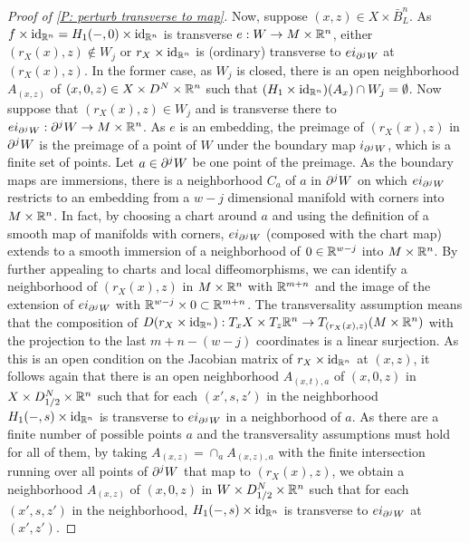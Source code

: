 \begin{proof}[Proof of \cref{P: perturb transverse to map}]
Now, suppose $(x,z)\in X\times \bar B^n_L$. As $f\times \mathrm{id}_{\mathbb{R}^n}=H_1(-,0)\times \mathrm{id}_{\mathbb{R}^n}$ is transverse $e:W\to M\times \mathbb{R}^n$, either $(r_X(x),z)\notin W_j$ or $r_X\times \mathrm{id}_{\mathbb{R}^n}$ is (ordinary) transverse to $ei_{\partial^jW}$ at $(r_X(x),z)$. In the former case, as $W_j$ is closed, there is an open neighborhood $A_{(x,z)}$ of $(x,0,z)\in X\times D^N\times \mathbb{R}^n$ such that $(H_1\times \mathrm{id}_{\mathbb{R}^n})(A_x)\cap W_j=\emptyset$. Now suppose that $(r_X(x),z)\in W_j$ and is transverse there to $ei_{\partial^jW}:\partial^jW\to M\times \mathbb{R}^n$. As $e$ is an embedding, the preimage of $(r_X(x),z)$ in $\partial^jW$ is the preimage of a point of $W$ under the boundary map $i_{\partial^jW}$, which is a finite set of points. Let $a\in \partial^jW$ be one point of the preimage. As the boundary maps are immersions, there is a neighborhood $C_a$ of $a$ in $\partial^jW$ on which $ei_{\partial^jW}$ restricts to an embedding from a $w-j$ dimensional manifold with corners into $M\times \mathbb{R}^n$. In fact, by choosing a chart around $a$ and using the definition of a smooth map of manifolds with corners, $ei_{\partial^jW}$ (composed with the chart map) extends to a smooth immersion of a neighborhood of $0\in \mathbb{R}^{w-j}$ into $M\times \mathbb{R}^n$.
 By further appealing to charts and local diffeomorphisms, we can identify a neighborhood of $(r_X(x),z)$ in $M\times \mathbb{R}^n$ with $\mathbb{R}^{m+n}$ and the image of the extension of $ei_{\partial^jW}$  with $\mathbb{R}^{w-j}\times 0\subset \mathbb{R}^{m+n}$.
 The transversality assumption means that the composition of $D(r_X\times \mathrm{id}_{\mathbb{R}^n}):T_xX\times T_z\mathbb{R}^n
\to T_{(r_X(x),z)}(M\times \mathbb{R}^n)$ with the projection to the last $m+n-(w-j)$ coordinates is a linear surjection. As this is an open condition on the Jacobian matrix of $r_X\times \mathrm{id}_{\mathbb{R}^n}$ at $(x,z)$, it follows again that there is an open neighborhood $A_{(x,t),a}$ of $(x,0,z)$ in $X\times D_{1/2}^N\times \mathbb{R}^n$ such that for each $(x',s,z')$ in the neighborhood $H_1(-,s)\times \mathrm{id}_{\mathbb{R}^n}$ is transverse to $ei_{\partial^jW}$ in a neighborhood of $a$. As there are a finite number of possible points $a$ and the transversality assumptions must hold for all of them, by taking $A_{(x,z)}=\cap_a A_{(x,z),a}$ with the finite intersection running over all points of $\partial^jW$ that map to $(r_X(x),z)$, we obtain a neighborhood $A_{(x,z)}$ of $(x,0,z)$ in $W\times D_{1/2}^N\times \mathbb{R}^n$ such that for each $(x',s,z')$ in the neighborhood, $H_1(-,s)\times \mathrm{id}_{\mathbb{R}^n}$ is transverse to $ei_{\partial^jW}$ at $(x',z')$.


\end{proof}
